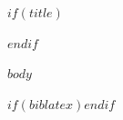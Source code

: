 \documentclass[$if(fontsize)$$fontsize$$else$12pt$endif$, $if(papersize)$$papersize$$else$letterpaper$endif$]{article}
\begin{document}
$if(title)$\maketitle$endif$

$body$

$if(biblatex)$\printbibliography$endif$
\end{document}
